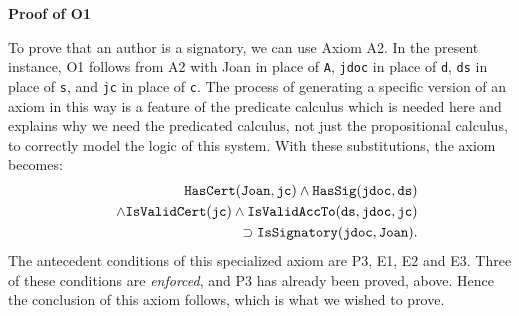 {\bf Proof of O1}

To prove that an author is a signatory, we can use Axiom A2. In the present instance, O1 follows
from A2 with Joan in place of {\tt A}, {\tt jdoc} in place of {\tt d}, 
{\tt ds} in place of {\tt s}, and {\tt jc} in place of {\tt c}.
The process of generating a specific version of an axiom in this way
is a feature of the predicate calculus which is needed here and explains
why we need the predicated calculus, not just the propositional calculus,
to correctly model the logic of this system. With these substitutions,
the axiom becomes:
\begin{eqnarray}\label{A2specific}\nonumber
&&\hbox{\tt HasCert}({\tt Joan},{\tt jc}) \wedge \hbox{\tt HasSig}({\tt jdoc},{\tt ds}) \\ \nonumber
&&\wedge \hbox{\tt IsValidCert}({\tt jc}) 
\wedge {\tt IsValidAccTo}({\tt ds},{\tt jdoc},{\tt jc}) \\ \nonumber
&&\supset \hbox{\tt IsSignatory}({\tt jdoc},{\tt Joan}).
\end{eqnarray}
The antecedent conditions of this specialized axiom are
P3, E1, E2 and E3. Three of these conditions are {\em enforced}, and P3 has
already been proved, above. Hence the conclusion of this axiom follows, which
is what we wished to prove.


